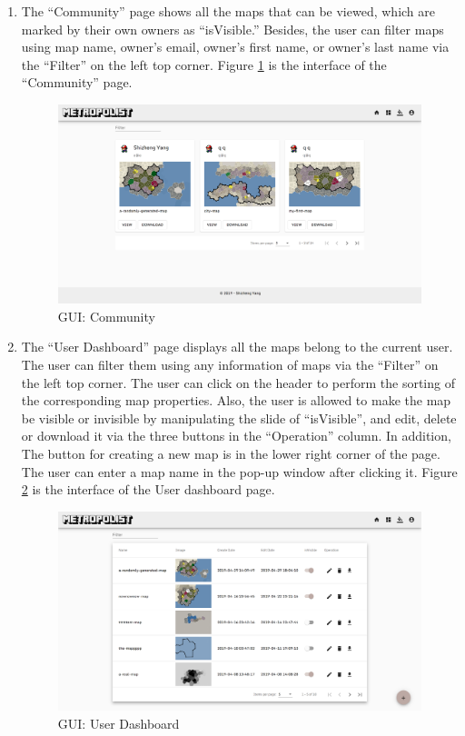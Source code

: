 \begin{enumerate}
  \item The ``Community'' page shows all the maps that can be viewed, which are marked by their own owners as ``isVisible.'' Besides, the user can filter maps using map name, owner's email, owner's first name, or owner's last name via the ``Filter'' on the left top corner. Figure \ref{fig:GUI community} is the interface of the ``Community'' page.

  \begin{figure}[htbp]
  \centering
  \includegraphics[width=\textwidth]{section04/assets/GUI-community.png}
  \caption[GUI: Community]{\label{fig:GUI community}GUI: Community}
  \end{figure}

  \item The ``User Dashboard'' page displays all the maps belong to the current user. The user can filter them using any information of maps via the ``Filter'' on the left top corner. The user can click on the header to perform the sorting of the corresponding map properties. Also, the user is allowed to make the map be visible or invisible by manipulating the slide of ``isVisible'', and edit, delete or download it via the three buttons in the ``Operation'' column. In addition, The button for creating a new map is in the lower right corner of the page. The user can enter a map name in the pop-up window after clicking it. Figure \ref{fig:GUI user dashboard} is the interface of the User dashboard page.

  \begin{figure}[htbp]
  \centering
  \includegraphics[width=\textwidth]{section04/assets/GUI-user.png}
  \caption[GUI: User Dashboard]{\label{fig:GUI user dashboard}GUI: User Dashboard}
  \end{figure}


\end{enumerate}
